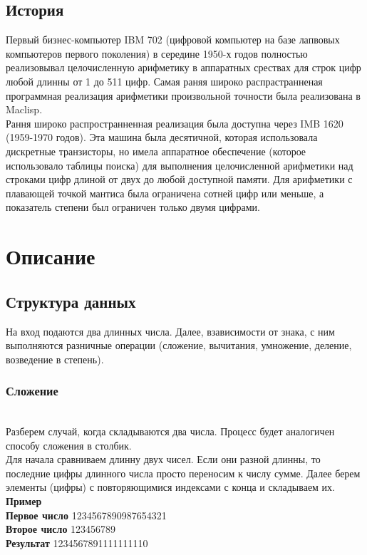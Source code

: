 \documentclass[a4paper]{article}
\begin{document}
\subsection{История}
Первый бизнес-компьютер IBM 702 (цифровой компьютер на базе лапвовых компьютеров первого поколения) в середине 1950-х годов полностью реализовывал целочисленную арифметику в аппаратных срествах для строк цифр любой длинны от 1 до 511 цифр. Самая раняя широко распрастранненая программная реализация арифметики произвольной точности была реализована в Maclisp. 
\\Рання широко распространненная реализация была доступна через IMB 1620 (1959-1970 годов). Эта машина была десятичной, которая использовала дискретные транзисторы, но имела аппаратное обеспечение (которое использовало таблицы поиска) для выполнения целочисленной арифметики над строками цифр длиной от двух до любой доступной памяти. Для арифметики с плавающей точкой мантиса была ограничена сотней цифр или меньше, а показатель степени был ограничен только двумя цифрами. 
\newpage

\section{Описание}
\subsection{Структура данных}
На вход подаются два длинных числа. Далее, взависимости от знака, с ним выполняются разничные операции (сложение, вычитания, умножение, деление, возведение в степень).

\subsubsection{Сложение}
\\Разберем случай, когда складываются два числа. Процесс будет аналогичен способу сложения в столбик.
\\Для начала сравниваем длинну двух чисел. Если они разной длинны, то последние цифры длинного числа просто переносим к числу сумме. Далее берем элементы (цифры) с повторяющимися индексами с конца и складываем их. 
\\ \textbf{Пример}
\\ \textbf{Первое число} 1234567890987654321
\\ \textbf{Второе число} 123456789
\\ \textbf{Результат} 1234567891111111110
\end{document}
